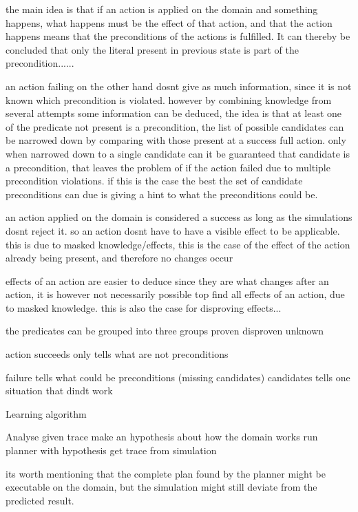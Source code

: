 	the main idea is that if an action is applied on the domain and something happens, what happens must be the effect of that action, and that the action happens means that the preconditions of the actions is fulfilled. It can thereby be concluded that only the literal present in previous state is part of the precondition......
	
	an action failing on the other hand dosnt give as much information, since it is not known which precondition is violated. however by combining knowledge from several attempts some information can be deduced, the idea is that at least one of the predicate not present is a precondition, the list of possible candidates can be narrowed down by comparing with those present at a success full action. only when narrowed down to a single candidate can it be guaranteed that candidate is a precondition, that leaves the problem of if the action failed due to multiple precondition violations. if this is the case the best the set of candidate preconditions can due is giving a hint to what the preconditions could be.
	
	
	an action applied on the domain is considered a success as long as the simulations dosnt reject it. so an action dosnt have to have a visible effect to be applicable. this is due to masked knowledge/effects, this is the case of the effect of the action already being present, and therefore no changes occur
	
	effects of an action are easier to deduce since they are what changes after an action, it is however not necessarily possible top find all effects of an action, due to masked knowledge.
	this is also the case for disproving effects...
	
	
	
	the predicates can be grouped into three groups
		proven
		disproven
		unknown
		
	action 	
		succeeds
			only tells what are not preconditions
			
		failure
			tells what could be preconditions (missing candidates)
				candidates
			tells one situation that dindt work
	

	
	\begin{algorithm}
		\caption{Learning algorithm}
		\label{mainAlgo}
		\begin{algorithmic}[1]
			\State Analyse given trace
			\State make an hypothesis about how the domain works
			\State run planner with hypothesis
			\State get trace from simulation
			\EndWhile
			
		\end{algorithmic}
	\end{algorithm}	
	its worth mentioning that the complete plan found by the planner might be executable on the domain, but the simulation might still deviate from the predicted result.
	
